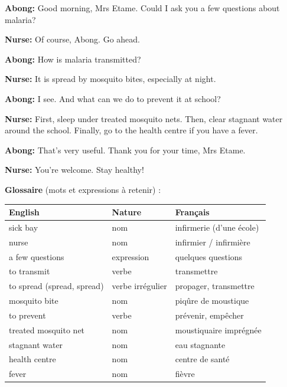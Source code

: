 \documentclass[11pt]{article}
\begin{document}
\begin{textebox}
\textbf{Abong:} Good morning, Mrs Etame. Could I ask you a few questions about malaria?

\textbf{Nurse:} Of course, Abong. Go ahead.

\textbf{Abong:} How is malaria transmitted?

\textbf{Nurse:} It is spread by mosquito bites, especially at night.

\textbf{Abong:} I see. And what can we do to prevent it at school?

\textbf{Nurse:} First, sleep under treated mosquito nets. Then, clear stagnant water around the school. Finally, go to the health centre if you have a fever.

\textbf{Abong:} That's very useful. Thank you for your time, Mrs Etame.

\textbf{Nurse:} You're welcome. Stay healthy!
\end{textebox}

\textbf{Glossaire} (mots et expressions à retenir) :

\begin{center}
\begin{tabularx}{\linewidth}{|l|l|X|}\hline
\rowcolor{popblueL} \textbf{English} & \textbf{Nature} & \textbf{Français} \\ \hline
sick bay & nom & infirmerie (d'une école) \\ \hline
nurse & nom & infirmier / infirmière \\ \hline
a few questions & expression & quelques questions \\ \hline
to transmit & verbe & transmettre \\ \hline
to spread (spread, spread) & verbe irrégulier & propager, transmettre \\ \hline
mosquito bite & nom & piqûre de moustique \\ \hline
to prevent & verbe & prévenir, empêcher \\ \hline
treated mosquito net & nom & moustiquaire imprégnée \\ \hline
stagnant water & nom & eau stagnante \\ \hline
health centre & nom & centre de santé \\ \hline
fever & nom & fièvre \\ \hline
\end{tabularx}
\end{center}
\end{document}
